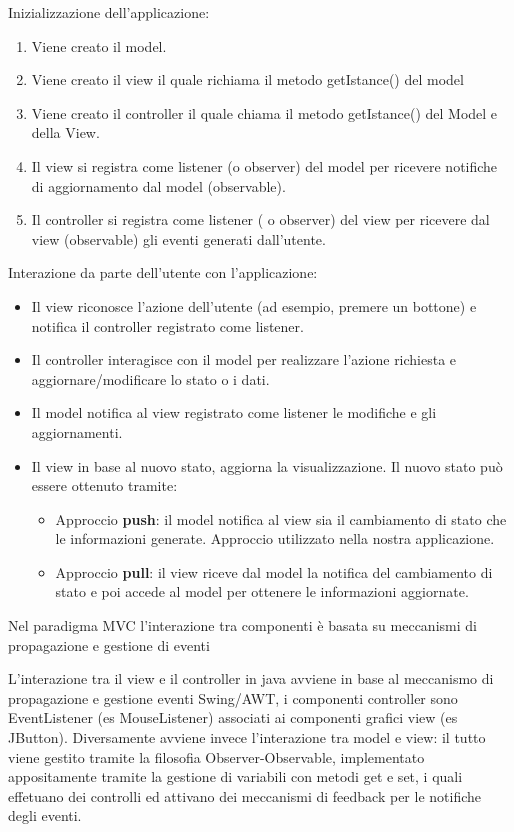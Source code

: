 			Inizializzazione dell'applicazione: 
			\begin{enumerate}
				\item Viene creato il model.
				\item Viene creato il view il quale richiama il metodo getIstance() del model
				\item Viene creato il controller il quale chiama il metodo getIstance() del Model e della View. 
				\item Il view si registra come listener (o observer) del model per ricevere notifiche di aggiornamento dal model (observable).
				\item Il controller si registra come listener ( o observer) del view per ricevere dal view (observable) gli eventi generati dall'utente.
			\end{enumerate}
			Interazione da parte dell'utente con l'applicazione: 
			\begin{itemize}
				\item Il view riconosce l'azione dell'utente (ad esempio, premere un bottone) e notifica il controller registrato come listener.
				\item Il controller interagisce con il model per realizzare l'azione richiesta e aggiornare/modificare lo stato o i dati.
				\item Il model notifica al view registrato come listener le modifiche e gli aggiornamenti.
				\item Il view in base al nuovo stato, aggiorna la visualizzazione. Il nuovo stato può essere ottenuto tramite:
				\begin{itemize}
					\item Approccio \textbf{push}: il model notifica al view sia il cambiamento di stato che le informazioni generate. Approccio utilizzato nella nostra applicazione.
					\item Approccio \textbf{pull}: il view riceve dal model la notifica del cambiamento di stato e poi accede al model per ottenere le informazioni aggiornate.
				\end{itemize}
			\end{itemize}
			
			Nel paradigma MVC l'interazione tra componenti è basata su meccanismi di propagazione e gestione di eventi 
			
			L'interazione tra il view e il controller in java avviene in base al meccanismo di propagazione e gestione eventi Swing/AWT, i componenti controller sono EventListener (es MouseListener) associati ai componenti grafici view (es JButton). 
			Diversamente avviene invece l'interazione tra model e view: il tutto viene gestito tramite la filosofia Observer-Observable, implementato appositamente tramite la gestione di variabili con metodi get e set, i quali effetuano dei controlli ed attivano dei meccanismi di feedback per le notifiche degli eventi.

